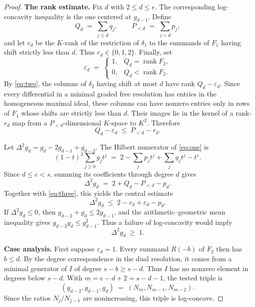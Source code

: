 \documentclass[11pt]{article}
\theoremstyle{remark}
\newcommand{\rank}{\operatorname{rank}}
\begin{document}
\begin{proof}
\medskip
\noindent\textbf{The rank estimate.}
Fix $d$ with $2 \le d \le e$. The corresponding log-concavity inequality is
the one centered at $g_{d-1}$. Define
\[
  Q_d \;=\; \sum_{j \le d} q_j, \qquad P_{<d} \;=\; \sum_{j < d} p_j ,
\]
and let $r_d$ be the $K$-rank of the restriction of $\delta_1$ to the
summands of $F_1$ having shift strictly less than $d$. Thus
$r_d \in \{0,1,2\}$. Finally, set
\[
  \varepsilon_d \;=\;
  \begin{cases}
    1, & Q_d = \rank F_2, \\
    0, & Q_d < \rank F_2 .
  \end{cases}
\]
By \eqref{eq:two}, the columns of $\delta_2$ having shift at most $d$ have
rank $Q_d - \varepsilon_d$. Since every differential in a minimal graded
free resolution has entries in the homogeneous maximal ideal, these columns
can have nonzero entries only in rows of $F_1$ whose shifts are strictly
less than $d$. Their images lie in the kernel of a rank-$r_d$ map from a
$P_{<d}$-dimensional $K$-space to $K^2$. Therefore
\begin{equation} \label{eq:three}
  Q_d - \varepsilon_d \;\le\; P_{<d} - r_d .
\end{equation}

Let $\Delta^2 g_d = g_d - 2g_{d-1} + g_{d-2}$. The Hilbert numerator of
\eqref{eq:one} is
\[
  (1-t)^3 \sum_{j \ge 0} g_j t^j
  \;=\; 2 - \sum_j p_j t^j + \sum_j q_j t^j - t^s .
\]
Since $d \le e < s$, summing its coefficients through degree $d$ gives
\[
  \Delta^2 g_d \;=\; 2 + Q_d - P_{<d} - p_d .
\]
Together with \eqref{eq:three}, this yields the central estimate
\begin{equation} \label{eq:four}
  \Delta^2 g_d \;\le\; 2 - r_d + \varepsilon_d - p_d .
\end{equation}
If $\Delta^2 g_d \le 0$, then $g_{d-2} + g_d \le 2 g_{d-1}$, and the
arithmetic--geometric mean inequality gives $g_{d-2} g_d \le g_{d-1}^2$.
Thus a failure of log-concavity would imply
\begin{equation} \label{eq:five}
  \Delta^2 g_d \;\ge\; 1 .
\end{equation}

\medskip
\noindent\textbf{Case analysis.}
First suppose $\varepsilon_d = 1$. Every summand $R(-b)$ of $F_2$ then has
$b \le d$. By the degree correspondence in the dual resolution, it comes
from a minimal generator of $I$ of degree $s - b \ge s - d$. Thus $I$ has no
nonzero element in degrees below $s-d$. With $m = e-d+2 = s-d-1$, the tested
triple is
\[
  (g_{d-2}, g_{d-1}, g_d) \;=\; (N_m, N_{m-1}, N_{m-2}).
\]
Since the ratios $N_j / N_{j-1}$ are nonincreasing, this triple is
log-concave.


\end{proof}
\end{document}
